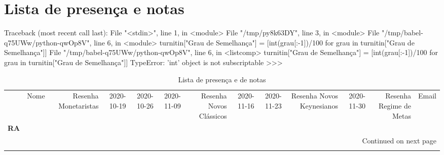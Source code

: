 \documentclass[11pt]{article}
\begin{document}
\section{Lista de presença e notas}
\label{sec:org28afd8a}
Traceback (most recent call last):
  File "<stdin>", line 1, in <module>
  File "/tmp/py8k63DY", line 3, in <module>
  File "/tmp/babel-q75UWw/python-qwOp8V", line 6, in <module>
    turnitin["Grau de Semelhança"] = [int(grau[:-1])/100 for grau in turnitin["Grau de Semelhança"]]
  File "/tmp/babel-q75UWw/python-qwOp8V", line 6, in <listcomp>
    turnitin["Grau de Semelhança"] = [int(grau[:-1])/100 for grau in turnitin["Grau de Semelhança"]]
TypeError: 'int' object is not subscriptable
>>> \begin{longtable}{llrrrrrrrrrrl}
\caption{Lista de presença e de notas}\label{lista}\\
\toprule
{} &                                   Nome &  Resenha Monetaristas &  2020-10-19 &  2020-10-26 &  2020-11-09 &  Resenha Novos Clássicos &  2020-11-16 &  2020-11-23 &  Resenha Novos Keynesianos &  2020-11-30 &  Resenha Regime de Metas &                   Email \\
\textbf{RA    } &                                        &                       &             &             &             &                          &             &             &                            &             &                          &                         \\
\midrule
\endhead
\midrule
\multicolumn{13}{r}{{Continued on next page}} \\
\midrule
\endfoot


\end{longtable}
\end{document}
